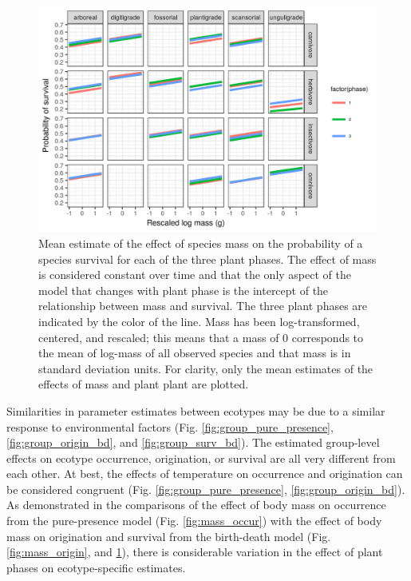 \documentclass[12pt,letterpaper]{article}
\begin{document}
\begin{figure}[ht]
  \centering
  \includegraphics[width=\textwidth,height=0.4\textheight,keepaspectratio=true]{figure/mass_on_surv_bd}
  \caption[Effect of mass on probability of species survival as estimated from the birth-death model]{Mean estimate of the effect of species mass on the probability of a species survival for each of the three plant phases. The effect of mass is considered constant over time and that the only aspect of the model that changes with plant phase is the intercept of the relationship between mass and survival. The three plant phases are indicated by the color of the line. Mass has been log-transformed, centered, and rescaled; this means that a mass of 0 corresponds to the mean of log-mass of all observed species and that mass is in standard deviation units. For clarity, only the mean estimates of the effects of mass and plant plant are plotted.}
  \label{fig:mass_survival}
\end{figure}


Similarities in parameter estimates between ecotypes may be due to a similar response to environmental factors (Fig. \ref{fig:group_pure_presence}, \ref{fig:group_origin_bd}, and \ref{fig:group_surv_bd}). The estimated group-level effects on ecotype occurrence, origination, or survival are all very different from each other. At best, the effects of temperature on occurrence and origination can be considered congruent (Fig. \ref{fig:group_pure_presence}, \ref{fig:group_origin_bd}). As demonstrated in the comparisons of the effect of body mass on occurrence from the pure-presence model (Fig. \ref{fig:mass_occur}) with the effect of body mass on origination and survival from the birth-death model (Fig. \ref{fig:mass_origin}, and \ref{fig:mass_survival}), there is considerable variation in the effect of plant phases on ecotype-specific estimates.
\end{document}
